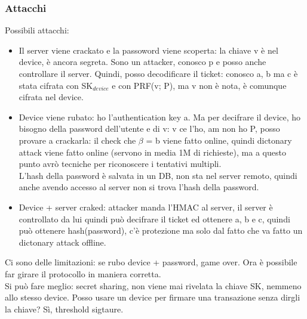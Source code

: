 \documentclass[16px]{article}
\begin{document}
\subsubsection{Attacchi}
Possibili attacchi:
\begin{itemize}
\item Il server viene crackato e la passoword viene scoperta: la chiave v è nel device, è ancora segreta. Sono un attacker, conosco p e posso anche controllare il server. Quindi, posso decodificare il ticket: conosco a, b ma c è stata cifrata con SK$_{device}$ e con PRF(v; P), ma v non è nota, è comunque cifrata nel device.
\item Device viene rubato: ho l'authentication key a. Ma per decifrare il device, ho bisogno della password dell'utente e di v: v ce l'ho, am non ho P, posso provare a crackarla: il check che $\beta$ = b viene fatto online, quindi dictonary attack viene fatto online (servono in media 1M di richieste), ma a questo punto avrò tecniche per riconoscere i tentativi multipli.\\ L'hash della password è salvata in un DB, non sta nel server remoto, quindi anche avendo accesso al server non si trova l'hash della password.
\item Device + server craked: attacker manda l'HMAC al server, il server è controllato da lui quindi può decifrare il ticket ed ottenere a, b e c, quindi può ottenere hash(password), c'è protezione ma solo dal fatto che va fatto un dictonary attack offline.
\end{itemize}
Ci sono delle limitazioni: se rubo device + password, game over. Ora è possibile far girare il protocollo in maniera corretta.\\ Si può fare meglio: secret sharing, non viene mai rivelata la chiave SK, nemmeno allo stesso device. Posso usare un device per firmare una transazione senza dirgli la chiave? Sì, threshold sigtaure.
\end{document}
